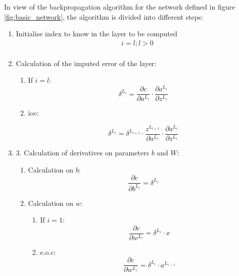 In view of the backpropagation algorithm for the network defined in figure \ref{fig:basic_network}, the algorithm is divided into different steps:
\begin{enumerate}
    
    \item Initialise index to know in the layer to be computed
    \begin{equation}
    \begin{split}
        i=l; l > 0 \\
    \end{split}
    \end{equation}
    
    
    \item \label{alg:backpropagation_loop} Calculation of the imputed error of the layer:
    \begin{enumerate}
        \item If $i=l$:
        \begin{equation}
        \delta^{L_i} = \frac{\partial c}{\partial a^{L_i}} \cdot \frac{\partial a^{L_i}}{\partial z^{L_i}}
        \end{equation}
        
        \item \acrshort{ioc}:
        
        \begin{equation}
        \delta^{L_i} = \delta^{L_{i+1}} \cdot \frac{z^{L_{i+1}}}{\partial a^{L_i}} \cdot \frac{\partial a^{L_i}}{\partial z^{L_i}}
        \end{equation}
    \end{enumerate}
    
    \item 3.	Calculation of derivatives on parameters $b$ and $W$:
    \begin{enumerate}
        \item Calculation on $b$:
        \begin{equation}
        \frac{\partial c}{\partial b^{L_i}} = \delta^{L_{i}}
        \end{equation}
        
        \item Calculation on $w$:
        \begin{enumerate}
            \item If $i=1$:
                \begin{equation}
                \frac{\partial c}{\partial w^{L_i}} = \delta^{L_{i}} \cdot x
                \end{equation}
            \item e.o.c:
                \begin{equation}
                \frac{\partial c}{\partial w^{L_i}} = \delta^{L_{i}} \cdot a^{L_{i-1}}
                \end{equation}
        \end{enumerate}
    \end{enumerate}
    

\end{enumerate}
